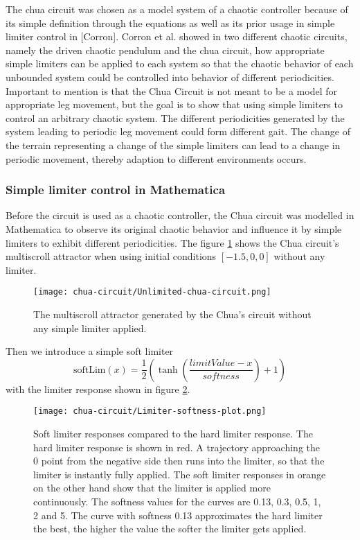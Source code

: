 \documentclass[main]{subfiles}
\begin{document}
The chua circuit was chosen as a model system of a chaotic controller because of its simple definition through the equations as well as its prior usage in simple limiter control in [Corron]. Corron et al. showed in two different chaotic circuits, namely the driven chaotic pendulum and the chua circuit, how appropriate simple limiters can be applied to each system so that the chaotic behavior of each unbounded system could be controlled into behavior of different periodicities. Important to mention is that the Chua Circuit is not meant to be a model for appropriate leg movement, but the goal is to show that using simple limiters to control an arbitrary chaotic system. The different periodicities generated by the system leading to periodic leg movement could form different gait. The change of the terrain representing a change of the simple limiters can lead to a change in periodic movement, thereby adaption to different environments occurs. 

\subsubsection{Simple limiter control in Mathematica}

Before the circuit is used as a chaotic controller, the Chua circuit was modelled in Mathematica to observe its original chaotic behavior and influence it by simple limiters to exhibit different periodicities. The figure \ref{figure:chaoticchuacircuit} shows the Chua circuit's multiscroll attractor when using initial conditions \([-1.5,0,0]\) without any limiter.

\begin{figure}[H]
\centering
\texttt{[image: chua-circuit/Unlimited-chua-circuit.png]}
\caption[The multiscroll attractor]{The multiscroll attractor generated by the Chua's circuit without any simple limiter applied.}
\label{figure:chaoticchuacircuit}
\end{figure}

Then we introduce a simple soft limiter \[\text{softLim}(x) = \frac{1}{2} \left(\tanh\left(\frac{limitValue - x}{softness}\right) + 1\right)\] with the limiter response shown in figure \ref{figure:softlimiterresponse}.

\begin{figure}[H]
\centering
\texttt{[image: chua-circuit/Limiter-softness-plot.png]}
\caption[Soft limiter responses]{Soft limiter responses compared to the hard limiter response. The hard limiter response is shown in red. A trajectory approaching the 0 point from the negative side then runs into the limiter, so that the limiter is instantly fully applied. The soft limiter responses in orange on the other hand show that the limiter is applied more continuously. The softness values for the curves are 0.13, 0.3, 0.5, 1, 2 and 5. The curve with softness 0.13 approximates the hard limiter the best, the higher the value the softer the limiter gets applied. }
\label{figure:softlimiterresponse}
\end{figure}
\end{document}

